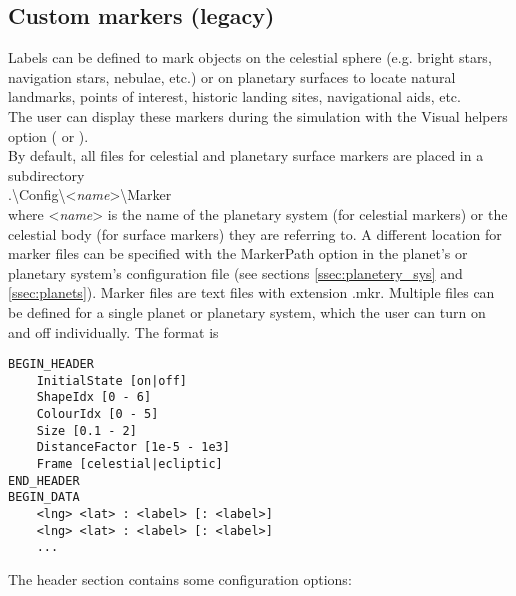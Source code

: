 \documentclass[Orbiter Developer Manual.tex]{subfiles}
\begin{document}
\subsection{Custom markers (legacy)}

\noindent
Labels can be defined to mark objects on the celestial sphere (e.g. bright stars, navigation stars, nebulae, etc.) or on planetary surfaces to locate natural landmarks, points of interest, historic landing sites, navigational aids, etc.\\
The user can display these markers during the simulation with the Visual helpers option ( or \Ctrl{}).\\
By default, all files for celestial and planetary surface markers are placed in a subdirectory\\
\indent .\textbackslash Config\textbackslash <\textit{name}>\textbackslash Marker\\
where <\textit{name}> is the name of the planetary system (for celestial markers) or the celestial body (for surface markers) they are referring to. A different location for marker files can be specified with the MarkerPath option in the planet's or planetary system's configuration file (see sections \ref{ssec:planetery_sys} and \ref{ssec:planets}). Marker files are text files with extension .mkr. Multiple files can be defined for a single planet or planetary system, which the user can turn on and off individually. The format is

\begin{lstlisting}[language=OSFS]
BEGIN_HEADER
	InitialState [on|off]
	ShapeIdx [0 - 6]
	ColourIdx [0 - 5]
	Size [0.1 - 2]
	DistanceFactor [1e-5 - 1e3]
	Frame [celestial|ecliptic]
END_HEADER
BEGIN_DATA
	<lng> <lat> : <label> [: <label>]
	<lng> <lat> : <label> [: <label>]
	...
\end{lstlisting}

\noindent
The header section contains some configuration options:
\end{document}
